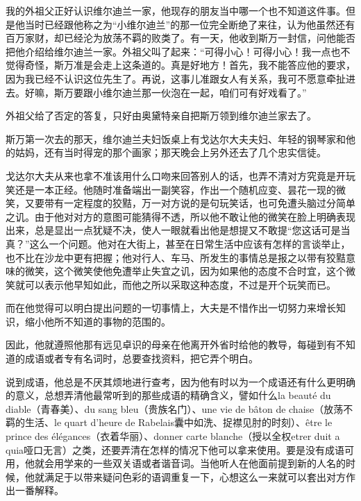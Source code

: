 \par 我的外祖父正好认识维尔迪兰一家，他现存的朋友当中哪一个也不知道这件事。但是他当时已经跟他称之为“小维尔迪兰”的那一位完全断绝了来往，认为他虽然还有百万家财，却已经沦为放荡不羁的败类了。有一天，他收到斯万一封信，问他能否把他介绍给维尔迪兰一家。外祖父叫了起来：“可得小心！可得小心！我一点也不觉得奇怪，斯万准是会走上这条道的。真是好地方！首先，我不能答应他的要求，因为我已经不认识这位先生了。再说，这事儿准跟女人有关系，我可不愿意牵扯进去。好嘛，斯万要跟小维尔迪兰那一伙泡在一起，咱们可有好戏看了。”
\par 外祖父给了否定的答复，只好由奥黛特亲自把斯万领到维尔迪兰家去了。
\par 斯万第一次去的那天，维尔迪兰夫妇饭桌上有戈达尔大夫夫妇、年轻的钢琴家和他的姑妈，还有当时得宠的那个画家；那天晚会上另外还去了几个忠实信徒。
\par 戈达尔大夫从来也拿不准该用什么口吻来回答别人的话，也弄不清对方究竟是开玩笑还是一本正经。他随时准备端出一副笑容，作出一个随机应变、昙花一现的微笑，又要带有一定程度的狡黠，万一对方说的是句玩笑话，也可免遭头脑过分简单之讥。由于他对对方的意图可能猜得不透，所以他不敢让他的微笑在脸上明确表现出来，总是显出一点犹疑不决，使人一眼就看出他是想提又不敢提“您这话可是当真？”这么一个问题。他对在大街上，甚至在日常生活中应该有怎样的言谈举止，也不比在沙龙中更有把握；他对行人、车马、所发生的事情总是报之以带有狡黠意味的微笑，这个微笑使他免遭举止失宜之讥，因为如果他的态度不合时宜，这个微笑就可以表示他早知如此，而他之所以采取这种态度，不过是开个玩笑而已。
\par 而在他觉得可以明白提出问题的一切事情上，大夫是不惜作出一切努力来增长知识，缩小他所不知道的事物的范围的。
\par 因此，他就遵照他那有远见卓识的母亲在他离开外省时给他的教导，每碰到有不知道的成语或者专有名词时，总要查找资料，把它弄个明白。
\par 说到成语，他总是不厌其烦地进行查考，因为他有时以为一个成语还有什么更明确的意义，总想弄清他最常听到的那些成语的精确含义，譬如什么la beauté du diable（青春美）、du sang bleu（贵族名门）、une vie de bâton de chaise（放荡不羁的生活、le quart d'heure de Rabelais囊中如洗、捉襟见肘的时刻）、être le prince des élégances（衣着华丽）、donner carte blanche（授以全权etrer duit a quia哑口无言）之类，还要弄清在怎样的情况下他可以拿来使用。要是没有成语可用，他就会用学来的一些双关语或者谐音词。当他听人在他面前提到新的人名的时候，他就满足于以带来疑问色彩的语调重复一下，心想这么一来就可以套出对方作出一番解释。
